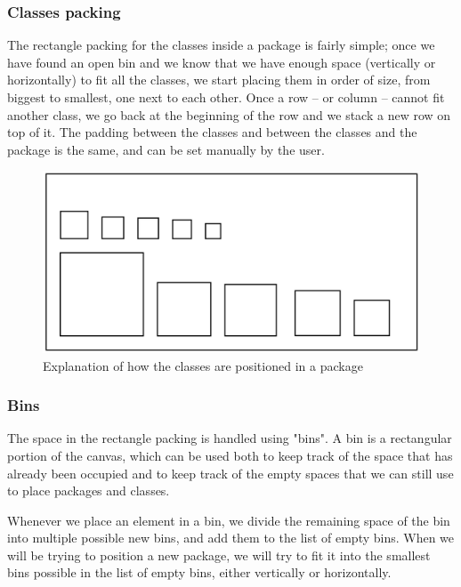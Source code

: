 \documentclass[]{usiinfbachelorproject}
\begin{document}
\subsubsection{Classes packing} \label{Classes packing}
The rectangle packing for the classes inside a package is fairly simple; once we have found an open bin and we know that we have enough space (vertically or horizontally) to fit all the classes, we start placing them in order of size, from biggest to smallest, one next to each other. Once a row -- or column -- cannot fit another class, we go back at the beginning of the row and we stack a new row on top of it. The padding between the classes and between the classes and the package is the same, and can be set manually by the user.

\begin{figure} [H]
\centering
\includegraphics[width=.7\textwidth]{pictures/classPacking.png}
\caption{Explanation of how the classes are positioned in a package}
\label{fig:classesPacking}
\end{figure}


\subsubsection{Bins} \label{Bins}
The space in the rectangle packing is handled using "bins". A bin is a rectangular portion of the canvas, which can be used both to keep track of the space that has already been occupied and to keep track of the empty spaces that we can still use to place packages and classes.

Whenever we place an element in a bin, we divide the remaining space of the bin into multiple possible new bins, and add them to the list of empty bins. When we will be trying to position a new package, we will try to fit it into the smallest bins possible in the list of empty bins, either vertically or horizontally.
\end{document}

